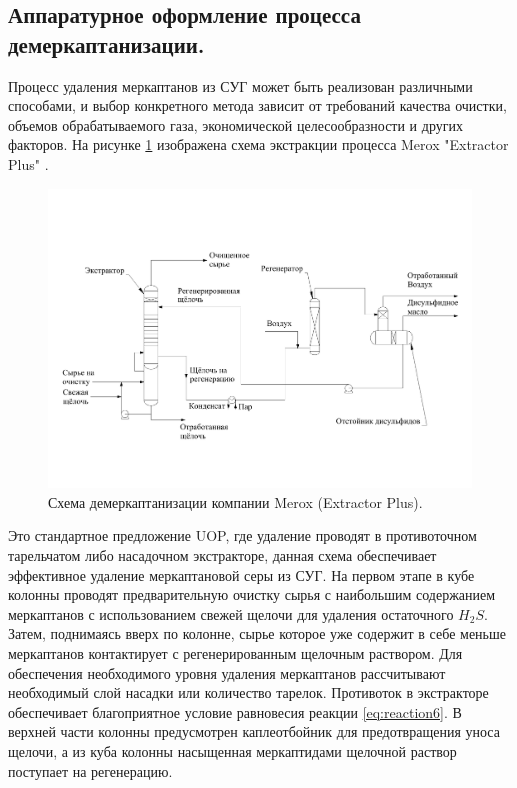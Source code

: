 \subsection{Аппаратурное оформление процесса демеркаптанизации.} \label{sec:ch1/sec2}

Процесс удаления меркаптанов из СУГ может быть реализован различными способами, и выбор конкретного метода зависит от требований качества очистки, объемов обрабатываемого газа, экономической целесообразности и других факторов. На рисунке \cref{fig:ExtPlus} изображена схема экстракции процесса Merox "Extractor Plus" \cite{bricker_advances_2012}.

\begin{figure}
	\centering
	\includegraphics[width=1\linewidth]{images/Extplus}
	\caption{Схема демеркаптанизации компании Merox (Extractor Plus).}
	\label{fig:ExtPlus}
\end{figure}

Это стандартное предложение UOP, где удаление проводят в противоточном тарельчатом либо насадочном экстракторе, данная схема обеспечивает эффективное удаление меркаптановой серы из СУГ. На первом этапе в кубе колонны проводят предварительную очистку сырья с наибольшим содержанием меркаптанов с использованием свежей щелочи для удаления остаточного $H_2S$. Затем, поднимаясь вверх по колонне, сырье которое уже содержит в себе меньше меркаптанов контактирует с регенерированным щелочным раствором. Для обеспечения необходимого уровня удаления меркаптанов рассчитывают необходимый слой насадки или количество тарелок. Противоток в экстракторе обеспечивает благоприятное условие равновесия реакции \cref{eq:reaction6}. В верхней части колонны предусмотрен каплеотбойник для предотвращения уноса щелочи, а из куба колонны насыщенная меркаптидами щелочной раствор поступает на регенерацию. 

